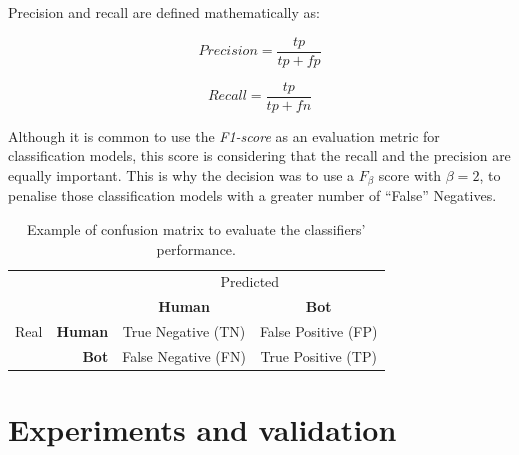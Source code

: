 \documentclass[a4paper, 12pt]{book}
\begin{document}
\newpage
Precision and recall are defined mathematically as:
\begin{center}
\begin{equation}
Precision = \frac{tp}{tp+fp}
\end{equation}

\begin{equation}
Recall = \frac{tp}{tp+fn}
\end{equation}
\end{center}

Although it is common to use the \emph{F1-score} as an evaluation metric for classification models, this score is considering that the recall and the precision are equally important. This is why the decision was to use a \emph{$F_{\beta}$} score with $\beta = 2$, to penalise those classification models with a greater number of ``False'' Negatives.

\begin{table}[tb]
\renewcommand{\arraystretch}{1.5}
\begin{center}
\begin{tabular}{ l r c c }
\toprule
      &                & \multicolumn{2}{c}{Predicted} \tabularnewline
      &                & \textbf{Human}                              & \textbf{Bot} \\
                         
 Real & \textbf{Human} & \cellcolor[HTML]{67FD9A}True Negative (TN)  & \cellcolor[HTML]{FD6864}False Positive (FP) \\ %
      & \textbf{Bot}   & \cellcolor[HTML]{FD6864}False Negative (FN) & \cellcolor[HTML]{67FD9A}True Positive (TP) \\ %
\bottomrule
\end{tabular}
\caption{Example of confusion matrix to evaluate the classifiers' performance.}
\label{table:example-confusion-matrix}
\end{center}
\end{table}

\cleardoublepage


\chapter{Experiments and validation}
\label{chap:experiments}
\end{document}
